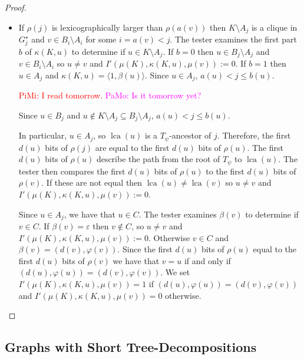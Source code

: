 \documentclass{patmorin}
\renewcommand{\le}{\leqslant}
\newcommand{\pat}[1]{\noindent\textcolor{Magenta}{PaMo: #1}}
\newcommand{\piotr}[1]{\noindent\textcolor{red}{PiMi: #1}}
\DeclareMathOperator{\lca}{lca}
\begin{document}
\begin{proof}
\begin{itemize}
       \item If $\rho(j)$ is lexicographically larger than $\rho(a(v))$ then $K\setminus A_j$ is a clique in $G^\star_j$ and $v\in B_i\setminus A_i$ for some $i=a(v) < j$.  The tester examines the first part $b$ of $\kappa(K,u)$ to determine if $u\in K\setminus A_j$.  If $b=0$ then  $u\in B_j\setminus A_j$ and $v\in B_i\setminus A_i$ so $u\neq v$ and $I'(\mu(K),\kappa(K,u),\mu(v)):=0$.  If $b=1$ then $u\in A_j$ and $\kappa(K,u)=\langle 1,\beta(u)\rangle$. Since $u\in A_j$, $a(u) < j\le b(u)$.

       \piotr{I read tomorrow.} \pat{Is it tomorrow yet?}



       Since $u\in B_j$ and $u\not\in K\setminus A_j\subseteq B_j\setminus A_j$, $a(u) < j \le b(u)$.

       In particular, $u\in A_j$, so $\lca(u)$ is a $T_\psi$-ancestor of $j$.   Therefore, the first $d(u)$ bits of $\rho(j)$ are equal to the first $d(u)$ bits of $\rho(u)$.  The first $d(u)$ bits of $\rho(u)$ describe the path from the root of $T_\psi$ to $\lca(u)$.  The tester then compares the first $d(u)$ bits of $\rho(u)$ to the first $d(u)$ bits of $\rho(v)$.  If these are not equal then $\lca(u)\neq\lca(v)$ so $u\neq v$ and $I'(\mu(K),\kappa(K,u),\mu(v)):=0$.

       Since $u\in A_j$, we have that $u\in C$.  The tester examines $\beta(v)$ to determine if $v\in C$.  If $\beta(v)=\varepsilon$ then $v\not\in C$, so $u\neq v$ and $I'(\mu(K),\kappa(K,u),\mu(v)):=0$. Otherwise $v\in C$ and $\beta(v)=(d(v),\varphi(v))$. Since the first $d(u)$ bits of $\rho(u)$ equal to the first $d(u)$ bits of $\rho(v)$ we have that $v=u$ if and only if $(d(u),\varphi(u))=(d(v),\varphi(v))$.
       We set $I'(\mu(K),\kappa(K,u),\mu(v))=1$ if $(d(u),\varphi(u))=(d(v),\varphi(v))$ and $I'(\mu(K),\kappa(K,u),\mu(v))=0$ otherwise.
     \end{itemize}
  \end{proof}



\subsection{Graphs with Short Tree-Decompositions}

\end{document}
